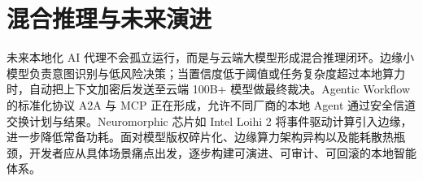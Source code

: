 \chapter{混合推理与未来演进}
未来本地化 AI 代理不会孤立运行，而是与云端大模型形成混合推理闭环。边缘小模型负责意图识别与低风险决策；当置信度低于阈值或任务复杂度超过本地算力时，自动把上下文加密后发送至云端 100B+ 模型做最终裁决。Agentic Workflow 的标准化协议 A2A 与 MCP 正在形成，允许不同厂商的本地 Agent 通过安全信道交换计划与结果。Neuromorphic 芯片如 Intel Loihi 2 将事件驱动计算引入边缘，进一步降低常备功耗。面对模型版权碎片化、边缘算力架构异构以及能耗散热瓶颈，开发者应从具体场景痛点出发，逐步构建可演进、可审计、可回滚的本地智能体系。\par
